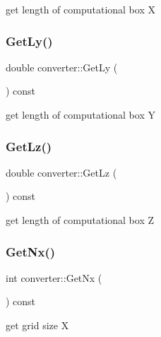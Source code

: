 get length of computational box X 

\mbox{\label{classconverter_a0354538702fac302486d859d62afbcfc}} 
\subsubsection{\texorpdfstring{Get\+Ly()}{GetLy()}}
{\footnotesize\ttfamily double converter\+::\+Get\+Ly (\begin{DoxyParamCaption}{ }\end{DoxyParamCaption}) const}



get length of computational box Y 

\mbox{\label{classconverter_af9260fc37b19c80b72fde252e6c71ef8}} 
\subsubsection{\texorpdfstring{Get\+Lz()}{GetLz()}}
{\footnotesize\ttfamily double converter\+::\+Get\+Lz (\begin{DoxyParamCaption}{ }\end{DoxyParamCaption}) const}



get length of computational box Z 

\mbox{\label{classconverter_a75d08969a972c30b96b5bfeb9fb39d03}} 
\subsubsection{\texorpdfstring{Get\+Nx()}{GetNx()}}
{\footnotesize\ttfamily int converter\+::\+Get\+Nx (\begin{DoxyParamCaption}{ }\end{DoxyParamCaption}) const}



get grid size X 

\mbox{\label{classconverter_a28a15a04873f427990d76c49b595f468}} 
